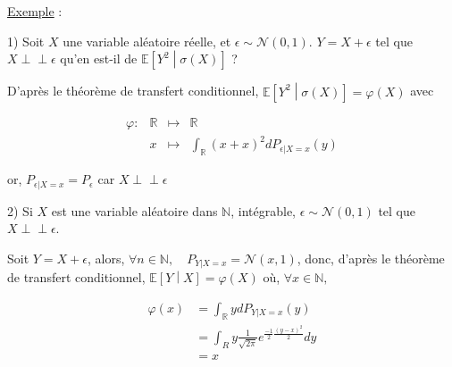 \documentclass[12pt]{article}
\newif\ifcorrection
\newcommand{\corr}[1]{\ifcorrection{\color{lightblue}#1\color{black}}\fi}
\newcommand{\petitespace}{\vspace{0.5cm}}
\newcommand{\bb}[1]{\mathbb{#1}} %
\newcommand{\R}{\bb{R}} %
\newcommand{\N}{\bb{N}}%
\renewcommand{\cal}{\mathcal}
\newcommand{\normale}[2]{\mathcal{N}(#1,#2)} %
\newcommand{\esp}[1]{\bb{ E} \mathopen{}\left[#1\right]} %
\newcommand{\espcond}[2]{\mathbb{E}\mathopen{}\left[#1\middle|#2\right]}%
\newcommand{\indep}{\perp \!\!\! \perp} %
\newcommand{\1}{\bb{1}} %
\begin{document}
\corr{\textbf{Preuve :}

Cas où $h \ge 0$. Soit $B \in \sigma(X)$. Montrons que $\esp{h(X,Y)\1_B}= \esp{\varphi(X)\1_B}$ 

$B$ s'écrit $B=X^{-1}(A), A \in \cal E$

\begin{align*}
	\esp{h(X,Y)\1_B} &=\esp{h(X,Y)\1_{\{ X \in A\}}}\\
	&= \int_{E\times F}h(x,y)\1_A(x) dP_{(X,Y)}(x,y)  \text{ (théorème de transfert)}\\
	&=\int_E\big(\int_Fh(x,y)\1_A(x)dP_{Y|X=x}(y)\big)dP_X(x) \text{ (Fubini généralisé cas positif)}\\
	&=\int_E\1_A(x)\big(\int_F \underbrace{h(x,y)dP_{Y|X=x}(y)}_{\varphi(x)}\big)dP_X(x) \\
	&=\int_E \1_A(x)\varphi(x) dP_X(x)\\
	&=\esp{\varphi(X)\1_{\{X \in A\}}} \text{ (théorème de transfert)}\\
	&=\esp{\varphi(X)\1_{B}}
\end{align*}

$\varphi(X)$ étant bien $\sigma(X)-$ mesurable, on a bien $\espcond{h(X,Y)}{X} = \varphi(X)$
\petitespace}

\underline{Exemple} :\petitespace

1) Soit $X$ une variable aléatoire réelle, et $\epsilon \sim \normale{0}{1}$. $Y=X+\epsilon$ tel que $X \indep \epsilon $ qu'en est-il de $\espcond{Y^2}{\sigma(X)}$ ?\petitespace

D'après le théorème de transfert conditionnel, $\espcond{Y^2}{\sigma(X)} = \varphi(X)$
avec 

$$\begin{array}{rrrl} %

  \varphi :&   \R  &\mapsto& \R\\
  & x & \mapsto &\int_\R (x+x)^2 dP_{\epsilon|X=x}(y)
\end{array}
$$

or, $P_{\epsilon|X=x}= P_\epsilon$ car $X \indep \epsilon$\petitespace


2) Si $X$ est une variable aléatoire dans $\N$, intégrable, $\epsilon \sim \normale{0}{1}$ tel que $X \indep \epsilon$. 

Soit $Y=X+\epsilon$, alors, $\forall n \in \N, \quad P_{Y|X=x}=\normale{x}{1}$, donc, d'après le théorème de transfert conditionnel, $\espcond{Y}{X}=\varphi(X)$ où, $\forall x \in  \N,$

\begin{align*}
	\varphi(x)&=\int_\R y dP_{Y|X=x}(y)\\
	&=\int_R y \frac{1}{\sqrt{2\pi}}e^{\frac{-1}{2}\frac{(y-x)^2}{2}}dy\\
	&=x
\end{align*}
\end{document}
